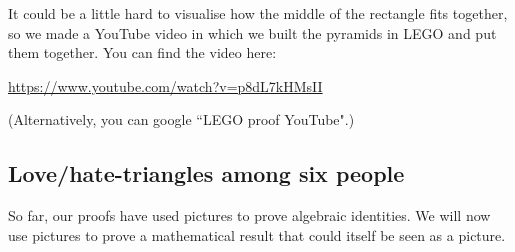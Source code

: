 \begin{center}
\end{center}

It could be a little hard to visualise how the middle of the rectangle fits together,
so we made a YouTube video in which we built the pyramids in LEGO and put them together.
You can find the video here:

\centerline{\url{https://www.youtube.com/watch?v=p8dL7kHMsII}}

(Alternatively, you can google ``LEGO proof YouTube".)

\medskip


\subsection*{Love/hate-triangles among six people}
\noindent
So far, our proofs have used pictures to prove algebraic identities.
We will now use pictures to prove a mathematical result
that could itself be seen as a picture.

